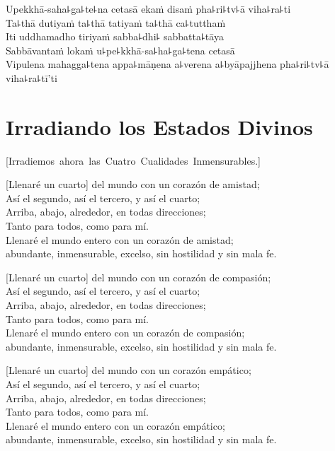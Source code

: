 Upekkhā-saha꜕ga꜕te꜕na cetasā ekaṁ disaṁ pha꜕ri꜕tv꜕ā viha꜕ra꜕ti\\
Ta꜕thā dutiyaṁ ta꜕thā tatiyaṁ ta꜕thā ca꜕tutthaṁ\\
Iti uddhamadho tiriyaṁ sabba꜕dhi꜕ sabbatta꜕tāya\\
Sabbāvantaṁ lokaṁ u꜕pe꜕kkhā-sa꜕ha꜕ga꜕tena cetasā\\
Vipulena mahagga꜕tena appa꜕māṇena a꜕verena a꜕byāpajjhena pha꜕ri꜕tv꜕ā viha꜕ra꜕tī'ti

\chapter*[Irradiando los Estados  Divinos]{Irradiando los Estados Divinos}

\enlargethispage{\baselineskip}


\begin{leader}
  \vspace*{-\baselineskip}
  \mbox{[Irradiemos ahora las Cuatro Cualidades Inmensurables.]}
\end{leader}

[Llenaré un cuarto] del mundo con un corazón de amistad;\\
Así el segundo, así el tercero, y así el cuarto;\\
Arriba, abajo, alrededor, en todas direcciones;\\
Tanto para todos, como para mí.\\
Llenaré el mundo entero con un corazón de amistad;\\ abundante, inmensurable, excelso, sin hostilidad y sin mala fe.

[Llenaré un cuarto] del mundo con un corazón de compasión;\\
Así el segundo, así el tercero, y así el cuarto;\\
Arriba, abajo, alrededor, en todas direcciones;\\
Tanto para todos, como para mí.\\
Llenaré el mundo entero con un corazón de compasión;\\ abundante, inmensurable, excelso, sin hostilidad y sin mala fe.

[Llenaré un cuarto] del mundo con un corazón empático;\\
Así el segundo, así el tercero, y así el cuarto;\\
Arriba, abajo, alrededor, en todas direcciones;\\
Tanto para todos, como para mí.\\
Llenaré el mundo entero con un corazón empático;\\ abundante, inmensurable, excelso, sin hostilidad y sin mala fe.

